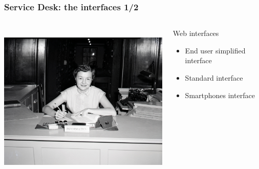 \documentclass{beamer}
\begin{document}
\begin{frame}

    \frametitle{Service Desk: the interfaces 1/2}

 \begin{columns}
 \begin{column}{0.45\textwidth}
         \includegraphics[height=7.5cm]{./pics/servicedesk2.jpg}
 \end{column}
 \begin{column}{0.45\textwidth}
     \begin{block}{Web interfaces}
        \begin{itemize}
            \item End user simplified interface
            \item Standard interface
            \item Smartphones interface
        \end{itemize}
    \end{block}

 \end{column}
\end{columns}






\end{frame}
\end{document}

